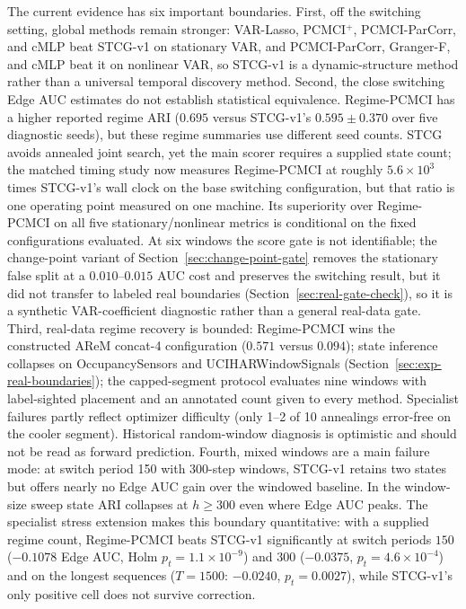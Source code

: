 \documentclass[sigconf,anonymous]{acmart}
\begin{document}
The current evidence has six important boundaries.
First, off the switching setting, global methods remain stronger: VAR-Lasso, PCMCI$^+$, PCMCI-ParCorr, and cMLP beat STCG-v1 on stationary VAR, and PCMCI-ParCorr, Granger-F, and cMLP beat it on nonlinear VAR, so STCG-v1 is a dynamic-structure method rather than a universal temporal discovery method.
Second, the close switching Edge AUC estimates do not establish statistical equivalence. Regime-PCMCI has a higher reported regime ARI ($0.695$ versus STCG-v1's $0.595 \pm 0.370$ over five diagnostic seeds), but these regime summaries use different seed counts. STCG avoids annealed joint search, yet the main scorer requires a supplied state count; the matched timing study now measures Regime-PCMCI at roughly $5.6\times10^{3}$ times STCG-v1's wall clock on the base switching configuration, but that ratio is one operating point measured on one machine. Its superiority over Regime-PCMCI on all five stationary/nonlinear metrics is conditional on the fixed configurations evaluated. At six windows the score gate is not identifiable; the change-point variant of Section~\ref{sec:change-point-gate} removes the stationary false split at a $0.010$--$0.015$ AUC cost and preserves the switching result, but it did not transfer to labeled real boundaries (Section~\ref{sec:real-gate-check}), so it is a synthetic VAR-coefficient diagnostic rather than a general real-data gate.
Third, real-data regime recovery is bounded: Regime-PCMCI wins the constructed AReM concat-4 configuration ($0.571$ versus $0.094$); state inference collapses on OccupancySensors and UCIHARWindowSignals (Section~\ref{sec:exp-real-boundaries}); the capped-segment protocol evaluates nine windows with label-sighted placement and an annotated count given to every method. Specialist failures partly reflect optimizer difficulty (only 1--2 of 10 annealings error-free on the cooler segment). Historical random-window diagnosis is optimistic and should not be read as forward prediction.
Fourth, mixed windows are a main failure mode: at switch period 150 with 300-step windows, STCG-v1 retains two states but offers nearly no Edge AUC gain over the windowed baseline. In the window-size sweep state ARI collapses at $h \geq 300$ even where Edge AUC peaks. The specialist stress extension makes this boundary quantitative: with a supplied regime count, Regime-PCMCI beats STCG-v1 significantly at switch periods $150$ ($-0.1078$ Edge AUC, Holm $p_t=1.1\times10^{-9}$) and $300$ ($-0.0375$, $p_t=4.6\times10^{-4}$) and on the longest sequences ($T{=}1500$: $-0.0240$, $p_t=0.0027$), while STCG-v1's only positive cell does not survive correction.
\end{document}
